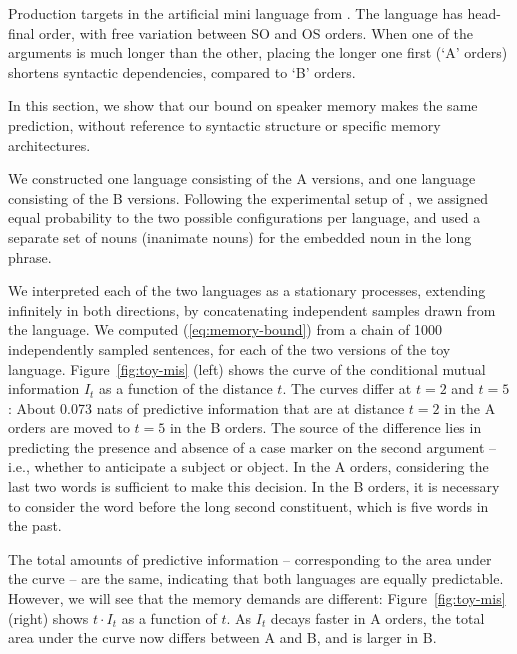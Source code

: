 \documentclass[11pt,letterpaper]{article}
\begin{document}
\begin{table}
			\caption{Production targets in the artificial mini language from \cite{fedzechkina-human-2017}. The language has head-final order, with free variation between SO and OS orders. When one of the arguments is much longer than the other, placing the longer one first (`A' orders) shortens syntactic dependencies, compared to `B' orders.}\label{tab:artificial}

\end{table}

In this section, we show that our bound on speaker memory makes the same prediction, without reference to syntactic structure or specific memory architectures. 

We constructed one language consisting of the A versions, and one language consisting of the B versions.
Following the experimental setup of \cite{fedzechkina-human-2017}, we assigned equal probability to the two possible configurations per language, and used a separate set of nouns (inanimate nouns) for the embedded noun in the long phrase.

We interpreted each of the two languages as a stationary processes, extending infinitely in both directions, by concatenating independent samples drawn from the language.
			We computed (\ref{eq:memory-bound}) from a chain of 1000 independently sampled sentences, for each of the two versions of the toy language.
			Figure~\ref{fig:toy-mis} (left) shows the curve of the conditional mutual information $I_t$ as a function of the distance $t$.
			The curves differ at $t=2$ and $t=5$: 
			About 0.073 nats of predictive information that are at distance $t=2$ in the A orders are moved to $t=5$ in the B orders.
			The source of the difference lies in predicting the presence and absence of a case marker on the second argument -- i.e., whether to anticipate a subject or object.
			In the A orders, considering the last two words is sufficient to make this decision.
			In the B orders, it is necessary to consider the word before the long second constituent, which is five words in the past.

			The total amounts of predictive information -- corresponding to the area under the curve -- are the same, indicating that both languages are equally predictable.
			However, we will see that the memory demands are different:
			Figure~\ref{fig:toy-mis} (right) shows $t\cdot I_t$ as a function of $t$.
			As $I_t$ decays faster in A orders, the total area under the curve now differs between A and B, and is larger in B.
\end{document}
